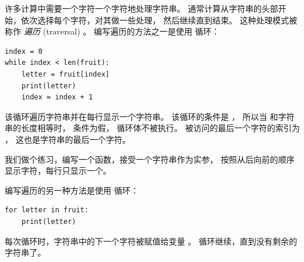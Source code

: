 
许多计算中需要一个字符一个字符地处理字符串。 通常计算从字符串的头部开始，依次选择每个字符，对其做一些处理，
然后继续直到结束。 这种处理模式被称作 {\em 遍历} (traversal) 。 编写遍历的方法之一是使用  循环：


\begin{lstlisting}
index = 0
while index < len(fruit):
    letter = fruit[index]
    print(letter)
    index = index + 1
\end{lstlisting}

%

该循环遍历字符串并在每行显示一个字符串。 该循环的条件是 ， 所以当  和字符串的长度相等时， 条件为假， 循环体不被执行。 被访问的最后一个字符的索引为 ， 这也是字符串的最后一个字符。


我们做个练习，编写一个函数，接受一个字符串作为实参，
按照从后向前的顺序显示字符，每行只显示一个。


编写遍历的另一种方法是使用  循环：

\begin{lstlisting}
for letter in fruit:
    print(letter)
\end{lstlisting}

%
  

每次循环时，字符串中的下一个字符被赋值给变量  。 循环继续，直到没有剩余的字符串了。

